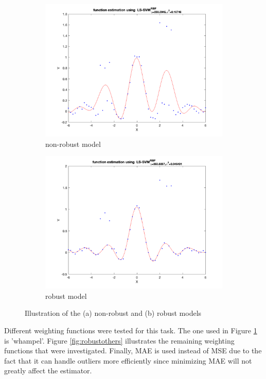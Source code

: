 \documentclass[a4paper, 11pt, one column]{article}
\begin{document}
\begin{figure}[H]
    \centering
    \begin{subfigure}{0.45\linewidth}
            \includegraphics[width=\linewidth]{images/non_robust.png}
            \caption{non-robust model}
        \end{subfigure}\hfil
        \begin{subfigure}{0.45\linewidth}
            \includegraphics[width=\linewidth]{images/robust.png}
            \caption{robust model}
        \end{subfigure}\hfil
    \caption{Illustration of the (a) non-robust and (b) robust models}
    \label{fig:robustregr}
\end{figure}
Different weighting functions were tested for this task. The one used in Figure \ref{fig:robustregr} is 'whampel'. Figure \ref{fig:robustothers} illustrates the remaining weighting functions that were investigated. Finally, MAE is used instead of MSE due to the fact that it can handle outliers more efficiently since minimizing MAE will not greatly affect the estimator.
\end{document}
